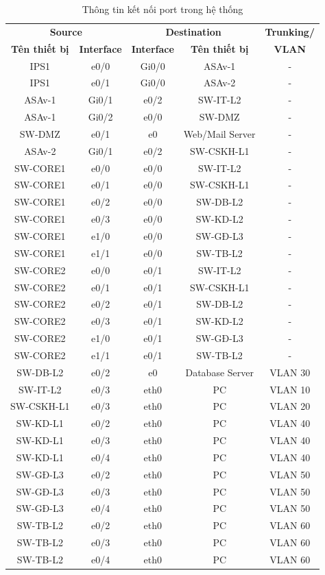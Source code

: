 \begin{table}[htbp]
\centering
\begin{tabular}{|c|c|c|c|c|}
\hline
\multicolumn{2}{|c|}{\textbf{Source}} & \multicolumn{2}{c|}{\textbf{Destination}} & \textbf{Trunking/ }\\
\cline{1-4}
\textbf{Tên thiết bị} & \textbf{Interface} & \textbf{Interface} & \textbf{Tên thiết bị} & \textbf{VLAN}\\
\hline
IPS1 & e0/0 & Gi0/0 & ASAv-1 & -\\
\hline
IPS1 & e0/1 & Gi0/0 & ASAv-2 & -\\
\hline
ASAv-1 & Gi0/1 &  e0/2 & SW-IT-L2 & -\\
\hline
ASAv-1 & Gi0/2 &  e0/0 & SW-DMZ & -\\
\hline
SW-DMZ& e0/1 &  e0 & Web/Mail Server & -\\
\hline
ASAv-2& Gi0/1 &  e0/2 & SW-CSKH-L1 & -\\
\hline
SW-CORE1 & e0/0  & e0/0 & SW-IT-L2 & -\\
\hline
SW-CORE1 & e0/1  & e0/0 & SW-CSKH-L1 & -\\
\hline
SW-CORE1 & e0/2  & e0/0 & SW-DB-L2 & -\\
\hline
SW-CORE1 & e0/3  & e0/0 & SW-KD-L2 & -\\
\hline
SW-CORE1 & e1/0  & e0/0 & SW-GĐ-L3 & -\\
\hline
SW-CORE1 & e1/1  & e0/0 & SW-TB-L2 & -\\
\hline
SW-CORE2 & e0/0  & e0/1 & SW-IT-L2 & -\\
\hline
SW-CORE2 & e0/1  & e0/1 & SW-CSKH-L1 & -\\
\hline
SW-CORE2 & e0/2  & e0/1 &SW-DB-L2 & -\\
\hline
SW-CORE2 & e0/3  & e0/1 & SW-KD-L2& -\\
\hline
SW-CORE2 & e1/0  & e0/1 & SW-GĐ-L3 & -\\
\hline
SW-CORE2 & e1/1  & e0/1 & SW-TB-L2 & -\\
\hline
SW-DB-L2 & e0/2  & e0 & Database Server & VLAN 30\\
\hline
 SW-IT-L2& e0/3  & eth0 & PC & VLAN 10\\
\hline
SW-CSKH-L1 & e0/3  & eth0 & PC & VLAN 20\\
\hline
SW-KD-L1 & e0/2  & eth0 & PC & VLAN 40\\
\hline
SW-KD-L1 & e0/3  & eth0 & PC & VLAN 40\\
\hline
SW-KD-L1 & e0/4  & eth0 & PC & VLAN 40\\
\hline
SW-GĐ-L3 & e0/2  & eth0 & PC & VLAN 50\\
\hline
SW-GĐ-L3 & e0/3  & eth0 & PC & VLAN 50\\
\hline
SW-GĐ-L3 & e0/4  & eth0 & PC & VLAN 50\\
\hline
SW-TB-L2 & e0/2  & eth0 & PC & VLAN 60\\
\hline
SW-TB-L2 & e0/3  & eth0 & PC & VLAN 60\\
\hline
SW-TB-L2 & e0/4  & eth0 & PC & VLAN 60\\
\hline
\end{tabular}
\caption{Thông tin kết nối port trong hệ thống}
\end{table}
\newpage

